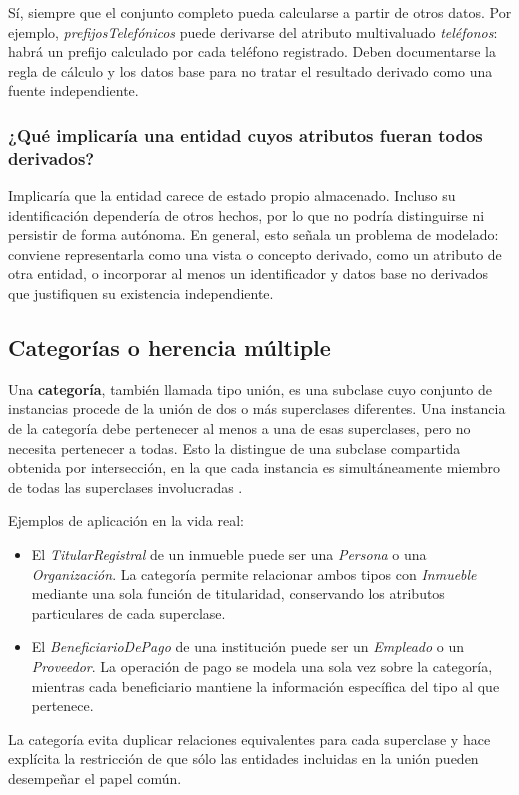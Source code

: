Sí, siempre que el conjunto completo pueda calcularse a partir de otros datos.
Por ejemplo, \emph{prefijosTelefónicos} puede derivarse del atributo
multivaluado \emph{teléfonos}: habrá un prefijo calculado por cada teléfono
registrado. Deben documentarse la regla de cálculo y los datos base para no
tratar el resultado derivado como una fuente independiente.

\subsubsection{¿Qué implicaría una entidad cuyos atributos fueran todos derivados?}

Implicaría que la entidad carece de estado propio almacenado. Incluso su
identificación dependería de otros hechos, por lo que no podría distinguirse ni
persistir de forma autónoma. En general, esto señala un problema de modelado:
conviene representarla como una vista o concepto derivado, como un atributo de
otra entidad, o incorporar al menos un identificador y datos base no derivados
que justifiquen su existencia independiente.

\subsection{Categorías o herencia múltiple}

Una \textbf{categoría}, también llamada tipo unión, es una subclase cuyo
conjunto de instancias procede de la unión de dos o más superclases diferentes.
Una instancia de la categoría debe pertenecer al menos a una de esas
superclases, pero no necesita pertenecer a todas. Esto la distingue de una
subclase compartida obtenida por intersección, en la que cada instancia es
simultáneamente miembro de todas las superclases involucradas
\cite{elmasri2016fundamentals}.

Ejemplos de aplicación en la vida real:

\begin{itemize}
  \item El \emph{TitularRegistral} de un inmueble puede ser una \emph{Persona}
        o una \emph{Organización}. La categoría permite relacionar ambos tipos
        con \emph{Inmueble} mediante una sola función de titularidad, conservando
        los atributos particulares de cada superclase.
  \item El \emph{BeneficiarioDePago} de una institución puede ser un
        \emph{Empleado} o un \emph{Proveedor}. La operación de pago se modela
        una sola vez sobre la categoría, mientras cada beneficiario mantiene la
        información específica del tipo al que pertenece.
\end{itemize}

La categoría evita duplicar relaciones equivalentes para cada superclase y
hace explícita la restricción de que sólo las entidades incluidas en la unión
pueden desempeñar el papel común.
